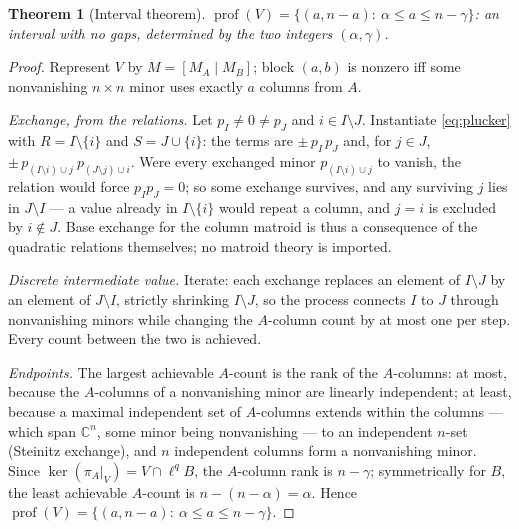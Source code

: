 \documentclass[10pt,a4paper]{amsart}
\newtheorem{theorem}{Theorem}
\newcommand{\C}{\mathbb{C}}
\newcommand{\prof}{\operatorname{prof}}
\begin{document}
\begin{theorem}[Interval theorem]\label{thm:interval}
$\prof(V)=\{(a,n-a):\ \alpha\le a\le n-\gamma\}$: an interval with no gaps, determined by the two integers $(\alpha,\gamma)$.
\end{theorem}

\begin{proof}
Represent $V$ by $M=[M_A\mid M_B]$; block $(a,b)$ is nonzero iff some nonvanishing $n\times n$ minor uses exactly $a$ columns from $A$.

\emph{Exchange, from the relations.} Let $p_I\ne0\ne p_J$ and $i\in I\setminus J$. Instantiate \eqref{eq:plucker} with $R=I\setminus\{i\}$ and $S=J\cup\{i\}$: the terms are $\pm\,p_I\,p_J$ and, for $j\in J$, $\pm\,p_{(I\setminus i)\cup j}\ p_{(J\setminus j)\cup i}$. Were every exchanged minor $p_{(I\setminus i)\cup j}$ to vanish, the relation would force $p_Ip_J=0$; so some exchange survives, and any surviving $j$ lies in $J\setminus I$ --- a value already in $I\setminus\{i\}$ would repeat a column, and $j=i$ is excluded by $i\notin J$. Base exchange for the column matroid is thus a consequence of the quadratic relations themselves; no matroid theory is imported.

\emph{Discrete intermediate value.} Iterate: each exchange replaces an element of $I\setminus J$ by an element of $J\setminus I$, strictly shrinking $I\setminus J$, so the process connects $I$ to $J$ through nonvanishing minors while changing the $A$-column count by at most one per step. Every count between the two is achieved.

\emph{Endpoints.} The largest achievable $A$-count is the rank of the $A$-columns: at most, because the $A$-columns of a nonvanishing minor are linearly independent; at least, because a maximal independent set of $A$-columns extends within the columns --- which span $\C^n$, some minor being nonvanishing --- to an independent $n$-set (Steinitz exchange), and $n$ independent columns form a nonvanishing minor. Since $\ker(\pi_A|_V)=V\cap\ell^qB$, the $A$-column rank is $n-\gamma$; symmetrically for $B$, the least achievable $A$-count is $n-(n-\alpha)=\alpha$. Hence $\prof(V)=\{(a,n-a):\ \alpha\le a\le n-\gamma\}$.
\end{proof}
\end{document}
